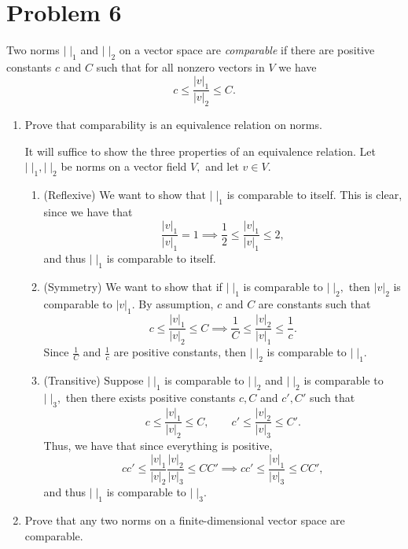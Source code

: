 \documentclass[11pt]{article}
\begin{document}
\newpage
\section*{Problem 6}
\begin{problem}
    Two norms $|\;|_1$ and $|\;|_2$ on a vector space are \textit{comparable} if there are positive constants $c$ and $C$ such that for all nonzero vectors in $V$ we have
    \[c \leq \frac{|v|_1}{|v|_2}\leq C.\]
\end{problem}
\begin{enumerate}
    \item 
    \begin{problem}
         Prove that comparability is an equivalence relation on norms.
    \end{problem}
    \begin{solution}
    It will suffice to show the three properties of an equivalence relation. Let $|\;|_1, |\;|_2$ be norms on a vector field $V,$ and let $v \in V.$ 
        \begin{enumerate}
            \item (Reflexive) We want to show that $|\;|_1$ is comparable to itself. This is clear, since we have that 
            \[\frac{|v|_1}{|v|_1} = 1 \implies \frac{1}{2}\leq \frac{|v|_1}{|v|_1}\leq 2,\] and thus $|\;|_1$ is comparable to itself.
            \item (Symmetry) We want to show that if $|\;|_1$ is comparable to $|\;|_2,$ then $|v|_2$ is comparable to $|v|_1.$ By assumption, $c$ and $C$ are constants such that
            \[c \leq \frac{|v|_1}{|v|_2} \leq C \implies \frac{1}{C}\leq \frac{|v|_2}{|v|_1}\leq \frac{1}{c}.\] Since $\frac{1}{C}$ and $\frac{1}{c}$ are positive constants, then $|\;|_2$ is comparable to $|\;|_1.$
            \item (Transitive) Suppose $|\;|_1$ is comparable to $|\;|_2$ and $|\;|_2$ is comparable to $|\;|_3,$ then there exists positive constants $c, C$ and $c', C'$ such that
            \[c \leq \frac{|v|_1}{|v|_2} \leq C, \qquad c' \leq \frac{|v|_2}{|v|_3} \leq C'.\] Thus, we have that since everything is positive,
            \[cc' \leq \frac{|v|_1}{|v|_2} \frac{|v|_2}{|v|_3}\leq CC' \implies cc' \leq \frac{|v|_1}{|v|_3} \leq CC',\] and thus $|\;|_1$ is comparable to $|\;|_3.$
        \end{enumerate}
    \end{solution}
    \item 
    \begin{problem}
        Prove that any two norms on a finite-dimensional vector space are comparable.

\end{problem}
\end{enumerate}
\end{document}

